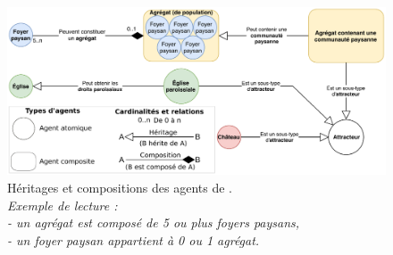 \begin{figure}[H]
	\centering
	\includegraphics[width=\linewidth]{img/agents_constitution.pdf}
	\caption[Héritages et compositions des agents de \simfeodal{}.]{Héritages et compositions des agents de \simfeodal{}.\\
		\textit{Exemple de lecture :\\
			- un agrégat est composé de 5 ou plus foyers paysans,\\
			- un foyer paysan appartient à 0 ou 1 agrégat.}}
	\label{fig:constitution-agents}
\end{figure}


